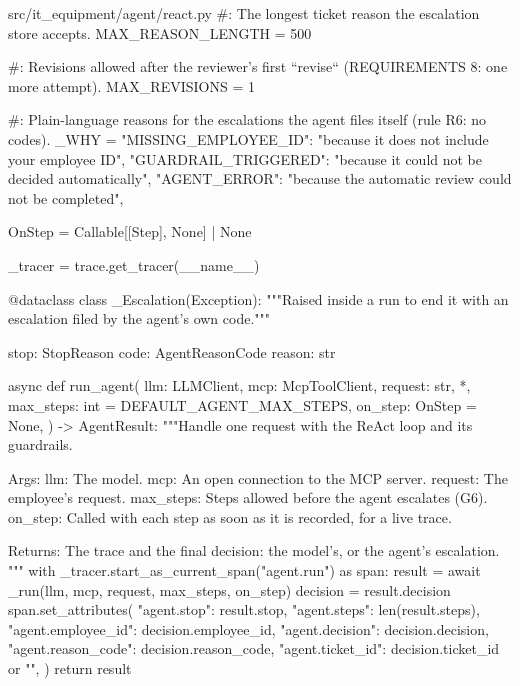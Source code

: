 \documentclass[11pt,letterpaper]{article}
\renewcommand{\_}{\textunderscore\allowbreak}
\begin{document}
\begin{codebox}{src/it_equipment/agent/react.py}
#: The longest ticket reason the escalation store accepts.
MAX_REASON_LENGTH = 500

#: Revisions allowed after the reviewer's first ``revise`` (REQUIREMENTS 8: one more attempt).
MAX_REVISIONS = 1

#: Plain-language reasons for the escalations the agent files itself (rule R6: no codes).
_WHY = {
    "MISSING_EMPLOYEE_ID": "because it does not include your employee ID",
    "GUARDRAIL_TRIGGERED": "because it could not be decided automatically",
    "AGENT_ERROR": "because the automatic review could not be completed",
}

OnStep = Callable[[Step], None] | None

_tracer = trace.get_tracer(__name__)


@dataclass
class _Escalation(Exception):
    """Raised inside a run to end it with an escalation filed by the agent's own code."""

    stop: StopReason
    code: AgentReasonCode
    reason: str


async def run_agent(
    llm: LLMClient,
    mcp: McpToolClient,
    request: str,
    *,
    max_steps: int = DEFAULT_AGENT_MAX_STEPS,
    on_step: OnStep = None,
) -> AgentResult:
    """Handle one request with the ReAct loop and its guardrails.

    Args:
        llm: The model.
        mcp: An open connection to the MCP server.
        request: The employee's request.
        max_steps: Steps allowed before the agent escalates (G6).
        on_step: Called with each step as soon as it is recorded, for a live trace.

    Returns:
        The trace and the final decision: the model's, or the agent's escalation.
    """
    with _tracer.start_as_current_span("agent.run") as span:
        result = await _run(llm, mcp, request, max_steps, on_step)
        decision = result.decision
        span.set_attributes(
            {
                "agent.stop": result.stop,
                "agent.steps": len(result.steps),
                "agent.employee_id": decision.employee_id,
                "agent.decision": decision.decision,
                "agent.reason_code": decision.reason_code,
                "agent.ticket_id": decision.ticket_id or "",
            }
        )
        return result



\end{codebox}
\end{document}
